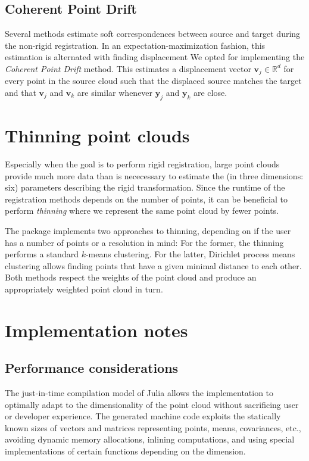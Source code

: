 \subsection{Coherent Point Drift}
Several methods estimate soft correspondences between source and target during
the non-rigid registration.
In an expectation-maximization fashion, this estimation is alternated with
finding displacement
We opted for implementing the \emph{Coherent Point Drift} method.
This estimates a displacement vector $\bm{v}_j \in \mathbb{R}^d$ for every
point in the source cloud such that the displaced source matches the target
and that $\bm{v}_j$ and $\bm{v}_k$ are similar whenever $\bm{y}_j$ and
$\bm{y}_k$ are close.

\section{Thinning point clouds}

Especially when the goal is to perform rigid registration, large point clouds
provide much more data than is nececessary to estimate the (in three dimensions:
six) parameters describing the rigid transformation.
Since the runtime of the registration methods depends on the number of points,
it can be beneficial to perform \emph{thinning} where we represent the same
point cloud by fewer points.

The package implements two approaches to thinning, depending on if the user has
a number of points or a resolution in mind:
For the former, the thinning performs a standard $k$-means clustering.
For the latter, Dirichlet process means clustering allows finding points that
have a given minimal distance to each other.
Both methods respect the weights of the point cloud and produce an appropriately
weighted point cloud in turn.

\section{Implementation notes}

\subsection{Performance considerations}

The just-in-time compilation model of Julia allows the implementation to
optimally adapt to the dimensionality of the point cloud without sacrificing
user or developer experience.
The generated machine code exploits the statically known sizes of vectors and
matrices representing points, means, covariances, etc., avoiding dynamic memory
allocations, inlining computations, and using special implementations of certain
functions depending on the dimension.

